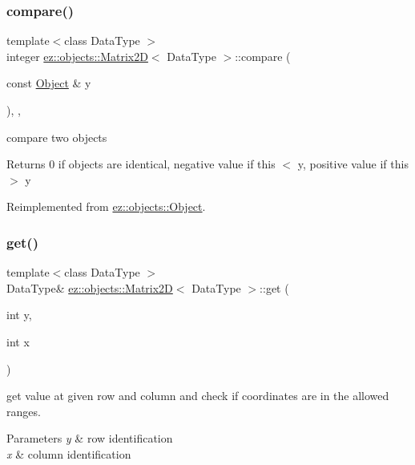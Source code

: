 \subsubsection{\texorpdfstring{compare()}{compare()}}
{\footnotesize\ttfamily template$<$class Data\+Type $>$ \\
integer \hyperlink{classez_1_1objects_1_1Matrix2D}{ez\+::objects\+::\+Matrix2D}$<$ Data\+Type $>$\+::compare (\begin{DoxyParamCaption}\item[{const \hyperlink{classez_1_1objects_1_1Object}{Object} \&}]{y }\end{DoxyParamCaption})\hspace{0.3cm}{\ttfamily [inline]}, {\ttfamily [override]}, {\ttfamily [virtual]}}

compare two objects \begin{DoxyReturn}{Returns}
0 if objects are identical, negative value if this $<$ y, positive value if this $>$ y 
\end{DoxyReturn}


Reimplemented from \hyperlink{classez_1_1objects_1_1Object_aca311d389dffa204e425463145f4e1e6}{ez\+::objects\+::\+Object}.

\mbox{\label{classez_1_1objects_1_1Matrix2D_a43445a3d46105c71f6e212c2b996bced}} 
\subsubsection{\texorpdfstring{get()}{get()}}
{\footnotesize\ttfamily template$<$class Data\+Type $>$ \\
Data\+Type\& \hyperlink{classez_1_1objects_1_1Matrix2D}{ez\+::objects\+::\+Matrix2D}$<$ Data\+Type $>$\+::get (\begin{DoxyParamCaption}\item[{int}]{y,  }\item[{int}]{x }\end{DoxyParamCaption})\hspace{0.3cm}{\ttfamily [inline]}}

get value at given row and column and check if coordinates are in the allowed ranges. 
\begin{DoxyParams}{Parameters}
{\em y} & row identification \\
\hline
{\em x} & column identification \\
\hline
\end{DoxyParams}
\mbox{\label{classez_1_1objects_1_1Matrix2D_acab487d980231c63d1ea4dd6de734b2f}} 
